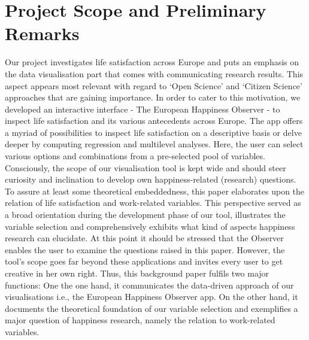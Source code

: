 \documentclass[preprint,12pt,authoryear]{elsarticle}
\begin{document}
	\newpage
	\tableofcontents
	\newpage
	
	
	\section{Project Scope and Preliminary Remarks}
	Our project investigates life satisfaction across Europe and puts an emphasis on the data visualisation part that comes
	with communicating research results. This aspect appears most relevant with regard to `Open Science' and `Citizen
	Science' approaches that are gaining importance. In order to cater to this motivation, we developed an interactive interface
	- The European Happiness Observer - to inspect life satisfaction and its various antecedents across Europe. The app offers
	a myriad of possibilities to inspect life satisfaction on a descriptive basis or delve deeper by computing regression and multilevel
	analyses. Here, the user can select various options and combinations from a pre-selected pool of variables. \\
	Consciously, the scope of our visualisation tool is kept wide and should steer curiosity and inclination to develop own 
	happiness-related (research) questions. To assure at least some theoretical embeddedness, this paper elaborates upon the
	relation of life satisfaction and work-related variables. This perspective served as a broad orientation during the development
	phase of our tool, illustrates the variable selection and comprehensively exhibits what kind of aspects happiness research
	can elucidate. At this point it should be stressed that the Observer enables the user to examine the questions raised in this
	paper. However, the tool's scope goes far beyond these applications and invites every user to get creative in her own 
	right. Thus, this background paper fulfils two major functions: One the one hand, it communicates the data-driven
	approach of our visualisations i.e., the European Happiness Observer app. On the other hand, it documents the theoretical foundation
	of our variable selection and exemplifies a major question of happiness research, namely the relation to work-related
	variables.  
	
\end{document}

